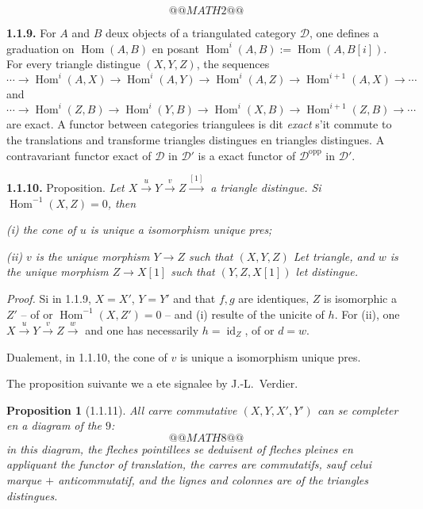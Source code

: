 \documentclass[12pt,a4paper]{article}
\theoremstyle{plain}
\newtheorem{proposition}[theorem]{Proposition}
\theoremstyle{definition}
\theoremstyle{remark}
\DeclareMathOperator{\Hom}{Hom}
\DeclareMathOperator{\id}{id}
\newcommand{\cD}{\mathcal{D}}
\begin{document}
\begin{center}
\[
@@MATH2@@
\]
\end{center}

\medskip

\noindent
\textbf{1.1.9.} For $A$ and $B$ deux objects of a triangulated category $\cD$, one defines a graduation on $\Hom(A, B)$ en posant $\Hom^{i}(A, B) := \Hom(A, B[i])$. For every triangle distingue $(X, Y, Z)$, the sequences
\[
\cdots \to \Hom^{i}(A, X) \to \Hom^{i}(A, Y) \to \Hom^{i}(A, Z) \to \Hom^{i+1}(A, X) \to \cdots
\]
and
\[
\cdots \to \Hom^{i}(Z, B) \to \Hom^{i}(Y, B) \to \Hom^{i}(X, B) \to \Hom^{i+1}(Z, B) \to \cdots
\]
are exact. A functor between categories triangulees is dit \emph{exact} s'it commute to the translations and transforme triangles distingues en triangles distingues. A contravariant functor exact of $\cD$ in $\cD'$ is a exact functor of $\cD^{\mathrm{opp}}$ in $\cD'$.

\medskip

\noindent
\textbf{1.1.10.} Proposition. \emph{Let $X \xrightarrow{u} Y \xrightarrow{v} Z \xrightarrow{[1]}$ a triangle distingue. Si $\Hom^{-1}(X, Z) = 0$, then}

\emph{(i) the cone of $u$ is unique a isomorphism unique pres;}

\emph{(ii) $v$ is the unique morphism $Y \to Z$ such that $(X, Y, Z)$ Let triangle, and $w$ is the unique morphism $Z \to X[1]$ such that $(Y, Z, X[1])$ let distingue.}

\smallskip

\emph{Proof.} Si in 1.1.9, $X = X'$, $Y = Y'$ and that $f, g$ are identiques, $Z$ is isomorphic a $Z'$ -- of or $\Hom^{-1}(X, Z') = 0$ -- and (i) resulte of the unicite of $h$. For (ii), one $X \xrightarrow{u} Y \xrightarrow{v} Z \xrightarrow{w}$ and one has necessarily $h = \id_{Z}$, of or $d = w$.

\medskip

Dualement, in 1.1.10, the cone of $v$ is unique a isomorphism unique pres.

The proposition suivante we a ete signalee by J.-L.~Verdier.

\begin{proposition}[1.1.11]
All carre commutative $(X, Y, X', Y')$ can se completer en a diagram of the $9$:
\[
@@MATH8@@
\]
in this diagram, the fleches pointillees se deduisent of fleches pleines en appliquant the functor of translation, the carres are commutatifs, sauf celui marque $+$ anticommutatif, and the lignes and colonnes are of the triangles distingues.
\end{proposition}
\end{document}
